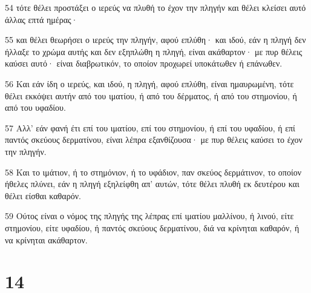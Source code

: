 \par 54 τότε θέλει προστάξει ο ιερεύς να πλυθή το έχον την πληγήν και θέλει κλείσει αυτό άλλας επτά ημέρας·
\par 55 και θέλει θεωρήσει ο ιερεύς την πληγήν, αφού επλύθη· και ιδού, εάν η πληγή δεν ήλλαξε το χρώμα αυτής και δεν εξηπλώθη η πληγή, είναι ακάθαρτον· με πυρ θέλεις καύσει αυτό· είναι διαβρωτικόν, το οποίον προχωρεί υποκάτωθεν ή επάνωθεν.
\par 56 Και εάν ίδη ο ιερεύς, και ιδού, η πληγή, αφού επλύθη, είναι ημαυρωμένη, τότε θέλει εκκόψει αυτήν από του ιματίου, ή από του δέρματος, ή από του στημονίου, ή από του υφαδίου.
\par 57 Αλλ' εάν φανή έτι επί του ιματίου, επί του στημονίου, ή επί του υφαδίου, ή επί παντός σκεύους δερματίνου, είναι λέπρα εξανθίζουσα· με πυρ θέλεις καύσει το έχον την πληγήν.
\par 58 Και το ιμάτιον, ή το στημόνιον, ή το υφάδιον, παν σκεύος δερμάτινον, το οποίον ήθελες πλύνει, εάν η πληγή εξηλείφθη απ' αυτών, τότε θέλει πλυθή εκ δευτέρου και θέλει είσθαι καθαρόν.
\par 59 Ούτος είναι ο νόμος της πληγής της λέπρας επί ιματίου μαλλίνου, ή λινού, είτε στημονίου, είτε υφαδίου, ή παντός σκεύους δερματίνου, διά να κρίνηται καθαρόν, ή να κρίνηται ακάθαρτον.

\chapter{14}

